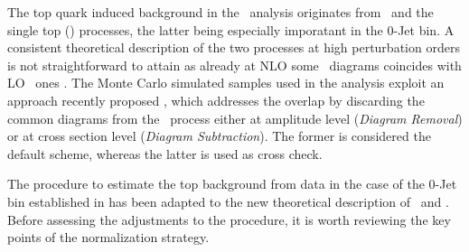 The top quark induced background in the \WW\ analysis originates from
\ttbar\ and the single top (\tw) processes, the latter being especially imporatant 
in the 0-Jet bin.  A consistent theoretical description of the two
processes at high perturbation orders is not straightforward to attain
as already at NLO some \tw\ diagrams coincides with LO \ttbar\
ones \cite{singleTopInterference}.  The Monte Carlo simulated samples
used in the analysis exploit an approach recently
proposed \cite{singleTopRemoval}, which addresses the overlap by
discarding the common diagrams from the \tw\ process either at
amplitude level ({\it Diagram Removal}) or at cross section level
({\it Diagram Subtraction}).  The former is considered the default
scheme, whereas the latter is used as cross check.

The procedure to estimate the top background from data in the case of
the 0-Jet bin established in \cite{HWW2011} has been adapted to the
new theoretical description of \ttbar\ and \tw{}. Before assessing the
adjustments to the procedure, it is worth reviewing the key points of
the normalization strategy.

